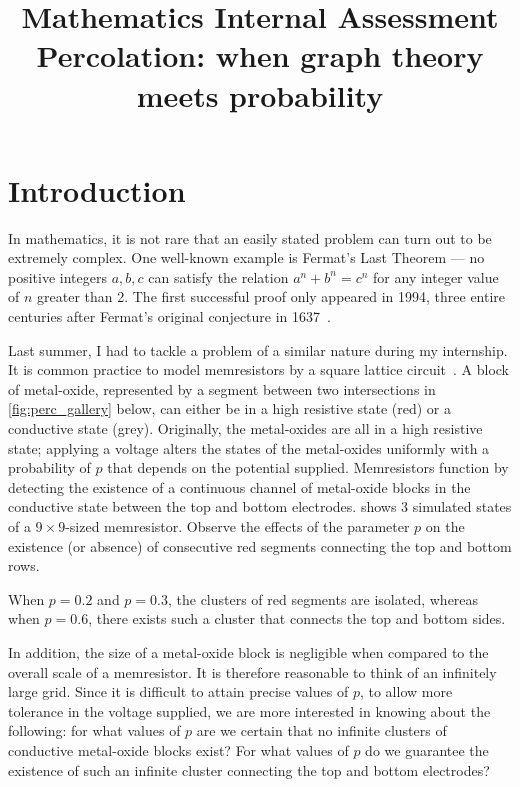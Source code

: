\documentclass[a4paper, 12pt]{article}
\title{
\textbf{Mathematics Internal Assessment}\\
\bigskip
Percolation: when graph theory meets probability
}
\author{}
\date{}
\begin{document}
\maketitle

\vspace{-1.5cm}
\section{Introduction}\label{sec:intro}
In mathematics, it is not rare that an easily stated problem can turn out to be extremely complex. One well-known example is Fermat's Last Theorem --- no positive integers $a, b, c$ can satisfy the relation $a^n + b^n = c^n$ for any integer value of $n$ greater than 2. The first successful proof only appeared in 1994, three entire centuries after Fermat's original conjecture in 1637~\autocite[60--62]{fermat}.

Last summer, I had to tackle a problem of a similar nature during my internship. It is common practice to model memresistors by a square lattice circuit~\autocite[1--2]{application}. A block of metal-oxide, represented by a segment between two intersections in \cref{fig:perc_gallery} below, can either be in a high resistive state (red) or a conductive state (grey). Originally, the metal-oxides are all in a high resistive state; applying a voltage alters the states of the metal-oxides uniformly with a probability of $p$ that depends on the potential supplied. Memresistors function by detecting the existence of a continuous channel of metal-oxide blocks in the conductive state between the top and bottom electrodes.  shows 3 simulated states of a $9 \times 9$-sized memresistor. Observe the effects of the parameter $p$ on the existence (or absence) of consecutive red segments connecting the top and bottom rows.



When $p = 0.2$ and $p = 0.3$, the clusters of red segments are isolated, whereas when $p = 0.6$, there exists such a cluster that connects the top and bottom sides. 

In addition, the size of a metal-oxide block is negligible when compared to the overall scale of a memresistor. It is therefore reasonable to think of an infinitely large grid. Since it is difficult to attain precise values of $p$, to allow more tolerance in the voltage supplied, we are more interested in knowing about the following: for what values of $p$ are we certain that no infinite clusters of conductive metal-oxide blocks exist? For what values of $p$ do we guarantee the existence of such an infinite cluster connecting the top and bottom electrodes?
\end{document}
